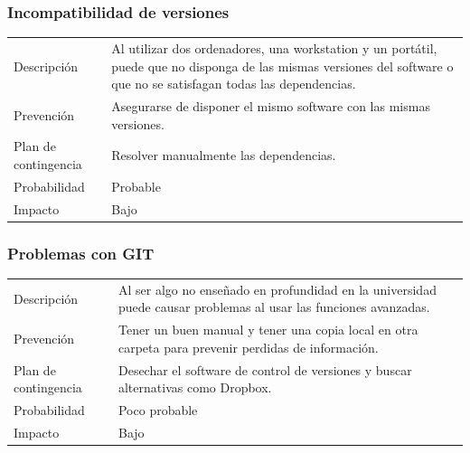 \subsubsection{Incompatibilidad de versiones}
\begin{table}[H]
    \begin{center}
        \begin{tabular}{l p{8cm}}
            Descripci\'{o}n                 & Al utilizar dos ordenadores, una workstation y un port\'{a}til, puede que no 
            								  disponga de las mismas versiones del software o que no se satisfagan todas las 
            								  dependencias. \\
            Prevenci\'{o}n                  & Asegurarse de disponer el mismo software con las mismas versiones. \\ 
            Plan de contingencia            & Resolver manualmente las dependencias. \\
            Probabilidad                    & Probable \\
            Impacto                         & Bajo\\
        \end{tabular}
    \end{center}
    
\end{table}

\clearpage

\subsubsection{Problemas con GIT}
\begin{table}[H]
    \begin{center}
        \begin{tabular}{l p{8cm}}
            Descripci\'{o}n                 & Al ser algo no ense\~{n}ado en profundidad en la universidad puede causar problemas al 
            								  usar las funciones avanzadas. \\
            Prevenci\'{o}n                  & Tener un buen manual y tener una copia local en otra carpeta para prevenir perdidas de 
            								  informaci\'{o}n. \\ 
            Plan de contingencia            & Desechar el software de control de versiones y buscar alternativas como Dropbox. \\
            Probabilidad                    & Poco probable \\
            Impacto                         & Bajo \\
        \end{tabular}
    \end{center}  
\end{table}
